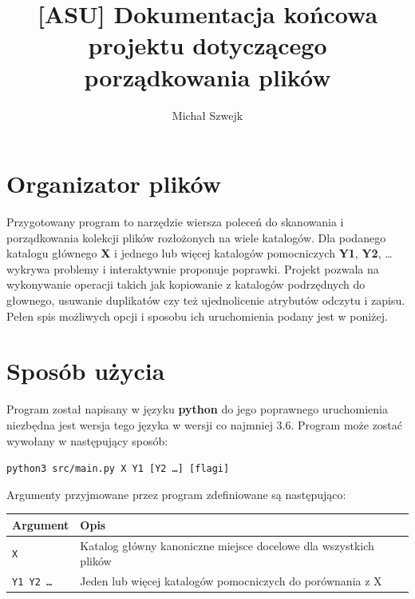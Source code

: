 \documentclass[12pt, a4paper]{article}
\begin{document}
\title{[ASU] \textendash{} Dokumentacja końcowa projektu dotyczącego
	porządkowania plików } \author{Michał Szwejk} \date{}
\maketitle

\section*{Organizator plików}
Przygotowany program to narzędzie wiersza poleceń do skanowania i porządkowania kolekcji plików
rozłożonych na wiele katalogów. Dla podanego katalogu głównego \textbf{X} i jednego
lub więcej katalogów pomocniczych \textbf{Y1}, \textbf{Y2}, \dots wykrywa problemy i
interaktywnie proponuje poprawki. Projekt pozwala na wykonywanie operacji takich
jak kopiowanie z katalogów podrzędnych do głownego, usuwanie duplikatów czy też
ujednolicenie atrybutów odczytu i zapisu. Pełen spis możliwych opcji i sposobu
ich uruchomienia podany jest w poniżej.

\section*{Sposób użycia}
Program został napisany w języku \textbf{python} \textendash{} do jego
poprawnego uruchomienia niezbędna jest wersja tego języka w wersji co najmniej
3.6. Program może zostać wywołany w następujący sposób:

\begin{center}
	\texttt{python3 src/main.py X Y1 [Y2 \ldots] [flagi]}
\end{center}

Argumenty przyjmowane przez program zdefiniowane są następująco:
\begin{table}[H]
	\centering
	\begin{tabularx}{\textwidth}{|l|X|}
		\hline
		\textbf{Argument}    & \textbf{Opis}                                   \\
		\hline
		\texttt{X}           & Katalog główny \textendash{} kanoniczne miejsce
		docelowe dla wszystkich plików                                         \\
		\hline
		\texttt{Y1 Y2 \dots} & Jeden lub więcej katalogów pomocniczych do
		porównania z X                                                         \\
		\hline
	\end{tabularx}
\end{table}
\end{document}
